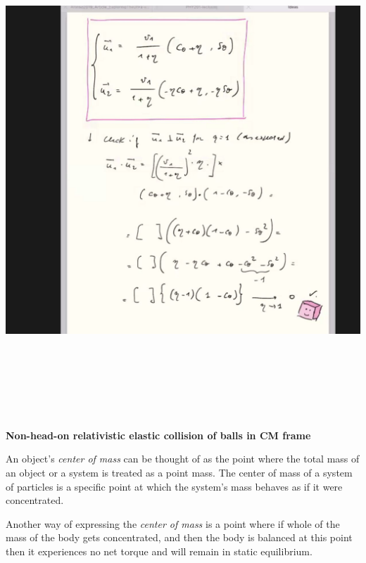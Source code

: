 \documentclass[fleqn]{article}
\begin{document}
\begin{center}
  \includegraphics[height=18.5cm, width=18cm]{11.JPG}
\end{center}

\pagebreak

\textbf{Non-head-on relativistic elastic collision of balls in CM frame}

\vspace{10px}

An object's \emph{center of mass} can be thought of as the point where the total mass of an object or a 
system is treated as a point mass. The center of mass of a system of particles is a specific point at 
which the system's mass behaves as if it were concentrated. 

Another way of expressing the \emph{center of mass} is a point where if whole of the mass of the body gets concentrated, 
and then the body is balanced at this point then it experiences no net torque and will remain in static equilibrium.
\end{document}
